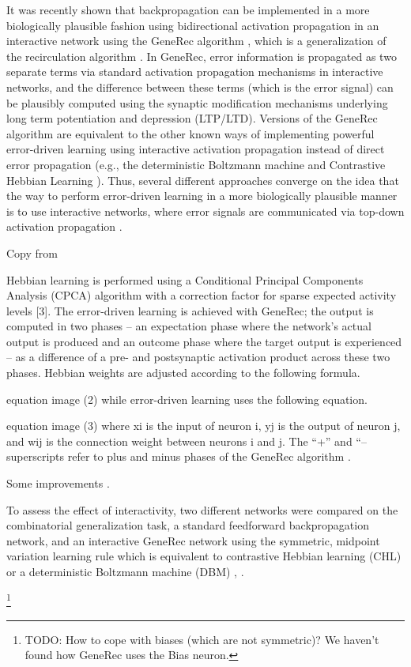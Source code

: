 It was recently shown that backpropagation can be implemented in a more biologically plausible fashion using bidirectional activation propagation in an interactive network using the GeneRec algorithm \citet{o1996bio}, which is a generalization of the recirculation algorithm \citet{hinton1988learning}. In GeneRec, error information is propagated as two separate terms via standard activation propagation mechanisms in interactive networks, and the difference between these terms (which is the error signal) can be plausibly computed using the synaptic modification mechanisms underlying long term potentiation and depression (LTP/LTD). Versions of the GeneRec algorithm are equivalent to the other known ways of implementing powerful error-driven learning using interactive activation propagation instead of direct error propagation (e.g., the deterministic Boltzmann machine \citet{hinton1989deterministic} and Contrastive Hebbian Learning \citet{movellan1990contrastive}). Thus, several different approaches converge on the idea that the way to perform error-driven learning in a more biologically plausible manner is to use interactive networks, where error signals are communicated via top-down activation propagation \citet{o2001generalization}.

Copy from \citet{da2011advances} 


Hebbian learning is performed using a Conditional Principal Components Analysis (CPCA) algorithm with a correction factor for sparse expected activity levels [3]. The error-driven learning is achieved with GeneRec; the output is computed in two phases – an expectation phase where the network's actual output is produced and an outcome phase where the target output is experienced – as a difference of a pre- and postsynaptic activation product across these two phases. Hebbian weights are adjusted according to the following formula.

equation image	(2)
while error-driven learning uses the following equation.

equation image	(3)
where xi is the input of neuron i, yj is the output of neuron j, and wij is the connection weight between neurons i and j. The “+” and “– superscripts refer to plus and minus phases of the GeneRec algorithm \citet{nawrocki2012monitoring}.

Some improvements \citet{da2008biological}. 

To assess the effect of interactivity, two different networks were compared on the combinatorial generalization task, a standard feedforward backpropagation network, and an interactive GeneRec network using the symmetric, midpoint variation learning rule which is equivalent to contrastive Hebbian learning (CHL) or a deterministic Boltzmann machine (DBM) \citet{o1996bio}, \citet{o2001generalization}. 
 
\footnote{TODO: How to cope with biases (which are not symmetric)? We haven't found how GeneRec uses the Bias neuron.} 
